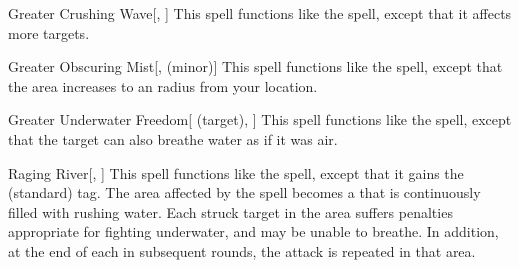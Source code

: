 \lowercase{\hypertarget{spell:Greater Crushing Wave}{}}\label{spell:Greater Crushing Wave}
\begin{freeability}[\nth{3}]{\hypertarget{spell:Greater Crushing Wave}{Greater Crushing Wave}}[, ]
This spell functions like the  spell, except that it affects more targets.
\end{freeability}
\vspace{0.25em}



\lowercase{\hypertarget{spell:Greater Obscuring Mist}{}}\label{spell:Greater Obscuring Mist}
\begin{freeability}[\nth{3}]{\hypertarget{spell:Greater Obscuring Mist}{Greater Obscuring Mist}}[,  (minor)]
\targetrule
This spell functions like the  spell, except that the area increases to an \arealarge radius  from your location.
\end{freeability}
\vspace{0.25em}



\lowercase{\hypertarget{spell:Greater Underwater Freedom}{}}\label{spell:Greater Underwater Freedom}
\begin{attuneability}[\nth{3}]{\hypertarget{spell:Greater Underwater Freedom}{Greater Underwater Freedom}}[ (target), ]
This spell functions like the  spell, except that the target can also breathe water as if it was air.
\end{attuneability}
\vspace{0.25em}



\lowercase{\hypertarget{spell:Raging River}{}}\label{spell:Raging River}
\begin{freeability}[\nth{3}]{\hypertarget{spell:Raging River}{Raging River}}[, ]
This spell functions like the  spell, except that it gains the  (standard) tag.
The area affected by the spell becomes a  that is continuously filled with rushing water.
Each struck target in the area suffers penalties appropriate for fighting underwater, and may be unable to breathe.
In addition, at the end of each  in subsequent rounds, the attack is repeated in that area.
\end{freeability}
\vspace{0.25em}



